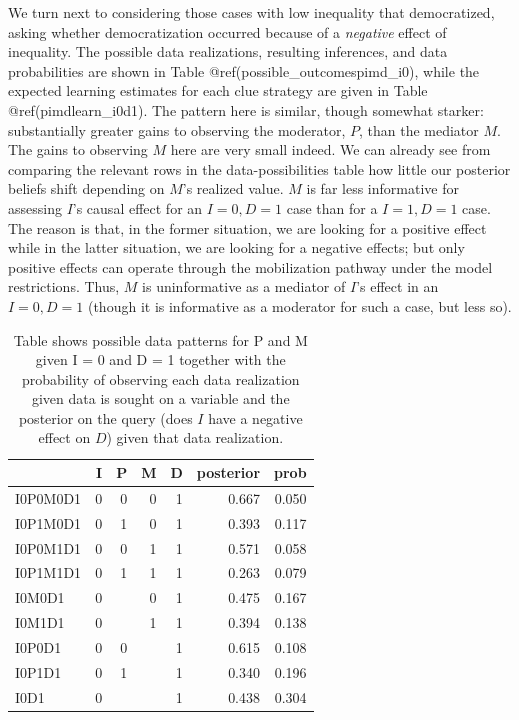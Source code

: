 \documentclass[
  12pt,
]{book}
\begin{document}
We turn next to considering those cases with low inequality that democratized, asking whether democratization occurred because of a \emph{negative} effect of inequality. The possible data realizations, resulting inferences, and data probabilities are shown in Table @ref(possible\_outcomespimd\_i0), while the expected learning estimates for each clue strategy are given in Table @ref(pimdlearn\_i0d1). The pattern here is similar, though somewhat starker: substantially greater gains to observing the moderator, \(P\), than the mediator \(M\). The gains to observing \(M\) here are very small indeed. We can already see from comparing the relevant rows in the data-possibilities table how little our posterior beliefs shift depending on \(M\)'s realized value. \(M\) is far less informative for assessing \(I\)'s causal effect for an \(I=0, D=1\) case than for a \(I=1, D=1\) case. The reason is that, in the former situation, we are looking for a positive effect while in the latter situation, we are looking for a negative effects; but only positive effects can operate through the mobilization pathway under the model restrictions. Thus, \(M\) is uninformative as a mediator of \(I\)'s effect in an \(I=0, D=1\) (though it is informative as a moderator for such a case, but less so).

\begin{table}

\caption{\label{tab:cinfer5}\label{possible_outcomespimd_i0} Table shows possible data patterns for P and M given I = 0 and D = 1 together with the probability of observing each data realization given data is sought on a variable and the posterior on the query (does $I$ have a negative effect on $D$) given that data realization.}
\centering
\begin{tabular}[t]{l|r|r|r|r|r|r}
\hline
  & I & P & M & D & posterior & prob\\
\hline
I0P0M0D1 & 0 & 0 & 0 & 1 & 0.667 & 0.050\\
\hline
I0P1M0D1 & 0 & 1 & 0 & 1 & 0.393 & 0.117\\
\hline
I0P0M1D1 & 0 & 0 & 1 & 1 & 0.571 & 0.058\\
\hline
I0P1M1D1 & 0 & 1 & 1 & 1 & 0.263 & 0.079\\
\hline
I0M0D1 & 0 &  & 0 & 1 & 0.475 & 0.167\\
\hline
I0M1D1 & 0 &  & 1 & 1 & 0.394 & 0.138\\
\hline
I0P0D1 & 0 & 0 &  & 1 & 0.615 & 0.108\\
\hline
I0P1D1 & 0 & 1 &  & 1 & 0.340 & 0.196\\
\hline
I0D1 & 0 &  &  & 1 & 0.438 & 0.304\\
\hline
\end{tabular}
\end{table}
\end{document}
